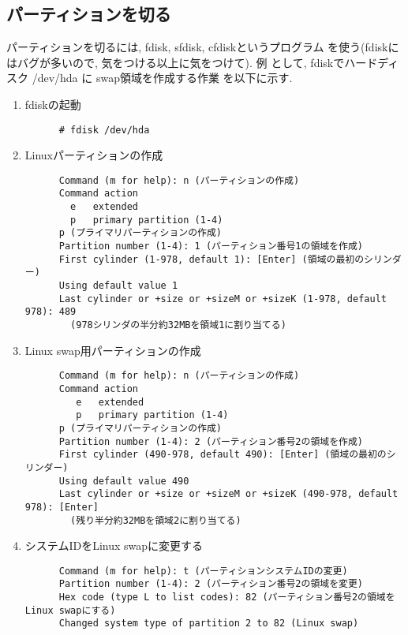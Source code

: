 \documentclass{jarticle}
\begin{document}
\subsection{パーティションを切る}

パーティションを切るには, fdisk, sfdisk, cfdiskというプログラム
を使う(fdiskにはバグが多いので, 気をつける以上に気をつけて). 例
として, fdiskでハードディスク /dev/hda に swap領域を作成する作業
を以下に示す. 

\begin{enumerate}
\item fdiskの起動

      \begin{verbatim}
      # fdisk /dev/hda
      \end{verbatim}

\item Linuxパーティションの作成

      \begin{verbatim}
      Command (m for help): n (パーティションの作成)
      Command action
        e   extended
        p   primary partition (1-4)
      p (プライマリパーティションの作成)
      Partition number (1-4): 1 (パーティション番号1の領域を作成)
      First cylinder (1-978, default 1): [Enter] (領域の最初のシリンダー)
      Using default value 1
      Last cylinder or +size or +sizeM or +sizeK (1-978, default 978): 489
        (978シリンダの半分約32MBを領域1に割り当てる)
      \end{verbatim}


\item Linux swap用パーティションの作成

      \begin{verbatim}
      Command (m for help): n (パーティションの作成)
      Command action
         e   extended
         p   primary partition (1-4)
      p (プライマリパーティションの作成)
      Partition number (1-4): 2 (パーティション番号2の領域を作成)
      First cylinder (490-978, default 490): [Enter] (領域の最初のシリンダー)
      Using default value 490
      Last cylinder or +size or +sizeM or +sizeK (490-978, default 978): [Enter]
        (残り半分約32MBを領域2に割り当てる)
      \end{verbatim}

\item システムIDをLinux swapに変更する

      \begin{verbatim}
      Command (m for help): t (パーティションシステムIDの変更)
      Partition number (1-4): 2 (パーティション番号2の領域を変更)
      Hex code (type L to list codes): 82 (パーティション番号2の領域をLinux swapにする)
      Changed system type of partition 2 to 82 (Linux swap)
      \end{verbatim}


\end{enumerate}
\end{document}
